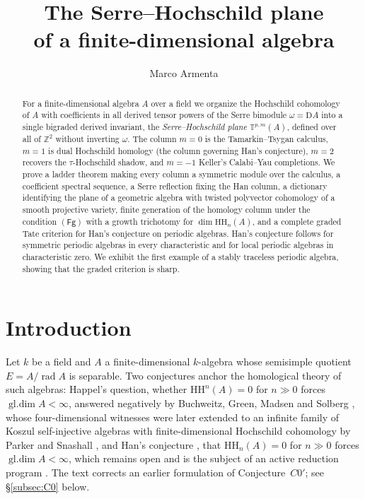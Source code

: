 \documentclass[11pt]{amsart}
\title[The Serre--Hochschild plane]{The Serre--Hochschild plane \\ of a finite-dimensional algebra}
\author{Marco Armenta}
\date{}
\theoremstyle{definition}
\newcommand{\T}{\mathbb{T}}
\newcommand{\HH}{\mathrm{HH}}
\newcommand{\D}{\mathrm{D}}
\newcommand{\gl}{\operatorname{gl.dim}}
\newcommand{\rad}{\operatorname{rad}}
\newcommand{\kk}{k}
\newcommand{\Fg}{\mathsf{(Fg)}}
\begin{document}
\begin{abstract}
For a finite-dimensional algebra $A$ over a field we organize the Hochschild
cohomology of $A$ with coefficients in all derived tensor powers of the Serre
bimodule $\omega=\D A$ into a single bigraded derived invariant, the
\emph{Serre--Hochschild plane} $\T^{p,m}(A)$, defined over all of
$\mathbb Z^2$ without inverting $\omega$. The column $m=0$ is the
Tamarkin--Tsygan calculus, $m=1$ is dual Hochschild homology (the column
governing Han's conjecture), $m=2$ recovers the $\tau$-Hochschild shadow, and $m=-1$ Keller's Calabi--Yau completions.
We prove a ladder theorem making every column a symmetric module over the
calculus, a coefficient spectral sequence, a Serre reflection fixing the Han
column, a dictionary identifying the plane of a geometric algebra with
twisted polyvector cohomology of a smooth projective variety, finite
generation of the homology column under the condition $\Fg$ with a growth
trichotomy for $\dim\HH_n(A)$, and a complete graded Tate criterion for
Han's conjecture on periodic algebras. Han's conjecture follows for symmetric
periodic algebras in every characteristic and for local periodic algebras in
characteristic zero. We exhibit the first example of a stably traceless
periodic algebra, showing that the graded criterion is sharp.
\end{abstract}

\maketitle
\setcounter{tocdepth}{1}
\tableofcontents

\section{Introduction}\label{sec:intro}

Let $\kk$ be a field and $A$ a finite-dimensional $\kk$-algebra whose
semisimple quotient $E=A/\rad A$ is separable. Two conjectures anchor the
homological theory of such algebras: Happel's question, whether
$\HH^n(A)=0$ for $n\gg0$ forces $\gl A<\infty$, answered negatively by
Buchweitz, Green, Madsen and Solberg \cite{BGMS}, whose four-dimensional
witnesses were later extended to an infinite family of Koszul self-injective
algebras with finite-dimensional Hochschild cohomology by Parker and Snashall
\cite{ParkerSnashall}, and Han's conjecture
\cite{Han06}, that $\HH_n(A)=0$ for $n\gg0$ forces $\gl A<\infty$, which
remains open and is the subject of an active reduction program
\cite{CLMS-strat,CLMS-tau,Cruz,QXZZ,WXZZ}. The text corrects an earlier
formulation of Conjecture~$C0'$; see \S\ref{subsec:C0} below.
\end{document}
